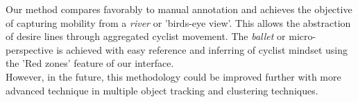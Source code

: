 Our method compares favorably to manual annotation and achieves the objective of capturing mobility
from a \textit{river} or 'birds-eye view'. This allows the abstraction of desire lines through aggregated cyclist movement. 
The \textit{ballet} or micro-perspective is achieved with easy reference and 
inferring of cyclist mindset using the 'Red zones' feature of our interface.
\ \\

However, in the future, this methodology could be improved further with more advanced technique in 
multiple object tracking and clustering techniques.